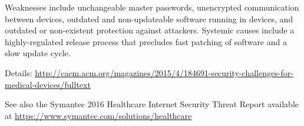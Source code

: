 Weaknesses include unchangeable master passwords, unencrypted communication between devices, outdated and non-updateable software running in devices, and outdated or non-existent protection against attackers.
Systemic causes include a highly-regulated release process that precludes fast patching of software and a slow update cycle.

Details:
\url{http://cacm.acm.org/magazines/2015/4/184691-security-challenges-for-medical-devices/fulltext}

See also the Symantec 2016 Healthcare Internet Security Threat Report available at \url{https://www.symantec.com/solutions/healthcare}

